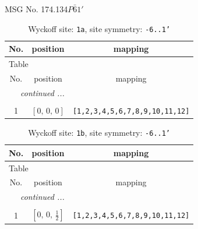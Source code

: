 \documentclass[fleqn,8pt]{jsarticle}
\begin{document}
\setcounter{MaxMatrixCols}{32}

\renewcommand{\tablename}{Table~}
\renewcommand{\figurename}{Figure~}
\begin{center}
\LARGE
MSG No. 174.134\quad$P\bar{6}1'$
\end{center}
\renewcommand{\arraystretch}{1.2}
\begin{longtable}{ccc}
\caption{Wyckoff site: {\tt 1a}, site symmetry: {\tt -6..1'}}
 \\
 \hline \hline
No. & position & mapping \\ \hline \endfirsthead

\multicolumn{2}{l}{\tablename\ \thetable{}} \\
 \hline \hline
No. & position & mapping \\ \hline \endhead

 \hline \hline
\multicolumn{2}{r}{\footnotesize\it continued ...} \\ \endfoot

 \hline \hline
\multicolumn{2}{r}{} \\ \endlastfoot

1 & $\left[ 0,\, 0,\, 0 \right]$ & {\tt [1,2,3,4,5,6,7,8,9,10,11,12]} \\
\end{longtable}
\renewcommand{\arraystretch}{1.2}
\begin{longtable}{ccc}
\caption{Wyckoff site: {\tt 1b}, site symmetry: {\tt -6..1'}}
 \\
 \hline \hline
No. & position & mapping \\ \hline \endfirsthead

\multicolumn{2}{l}{\tablename\ \thetable{}} \\
 \hline \hline
No. & position & mapping \\ \hline \endhead

 \hline \hline
\multicolumn{2}{r}{\footnotesize\it continued ...} \\ \endfoot

 \hline \hline
\multicolumn{2}{r}{} \\ \endlastfoot

1 & $\left[ 0,\, 0,\, \frac{1}{2} \right]$ & {\tt [1,2,3,4,5,6,7,8,9,10,11,12]} \\
\end{longtable}
\renewcommand{\arraystretch}{1.2}
\end{document}
